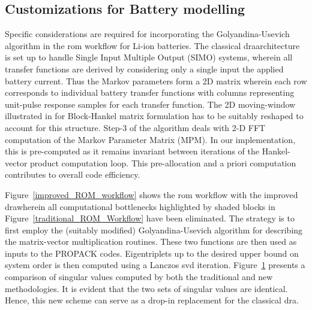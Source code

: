 \subsection{Customizations for Battery modelling}

Specific considerations are required for incorporating the Golyandina-Usevich
algorithm in the \gls{rom} workflow for Li-ion batteries. The classical
\gls{dra}architecture is set up to handle Single Input Multiple Output
(SIMO) systems, wherein all transfer functions are derived by considering
only a single input \textendash{} the applied battery current. Thus
the Markov parameters form a 2D matrix wherein each row corresponds
to individual battery transfer functions with columns representing
unit-pulse response samples for each transfer function. The 2D moving-window
illustrated in \cite{GolyandinaKorobeynikovShlemovEtAl2015} for
Block-Hankel matrix formulation has to be suitably reshaped to account
for this structure. Step-3 of the algorithm deals with 2-D FFT computation
of the Markov Parameter Matrix (MPM). In our implementation, this
is pre-computed as it remains invariant between iterations of the
Hankel-vector product computation loop. This pre-allocation and a
priori computation contributes to overall code efficiency.

Figure~\ref{improved_ROM_workflow} shows the \gls{rom} workflow with
the improved \gls{dra}wherein all computational bottlenecks highlighted
by shaded blocks in Figure~\ref{traditional_ROM_Workflow} have
been eliminated. The strategy is to first employ the (suitably modified)
Golyandina-Usevich algorithm for describing the matrix-vector multiplication
routines. These two functions are then used as inputs to the PROPACK
codes. Eigentriplets up to the desired upper bound on system order
is then computed using a Lanczos \gls{svd} iteration. Figure~\ref{svdcompare}
presents a comparison of singular values computed by both the  traditional
and new methodologies. It is evident that the two sets of singular
values are identical. Hence, this new scheme can serve as a drop-in
replacement for the classical \gls{dra}.

\begin{figure*}
	\caption{}
	\label{improved_ROM_workflow}
\end{figure*}



\begin{figure}
	\caption{}
	\label{svdcompare}
\end{figure}

